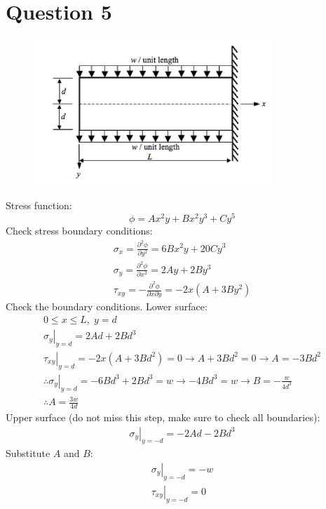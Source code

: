 \section{Question 5}
\begin{figure}[H]
    \centering
    \includegraphics[width = 0.8\textwidth]{./img/diagram1.png}
    \caption{}
\end{figure}
Stress function:
\begin{equation}
    \phi = Ax^2 y + Bx^2 y^3 + Cy^5
\end{equation}
Check stress boundary conditions:
\begin{gather}
    \sigma_x = \frac{\partial^2 \phi}{\partial y^2} = 6Bx^2 y + 20Cy^3\\
    \sigma_y = \frac{\partial^2 \phi}{\partial x^2} = 2Ay + 2By^3\\
    \tau_{xy} = -\frac{\partial^2 \phi}{\partial x\partial y} = -2x\left(A + 3By^2\right)
\end{gather}
Check the boundary conditions. Lower surface:
\begin{gather}
    0 \leq x \leq L, \; y = d\\
    \left. \sigma_y \right|_{y=d} = 2Ad + 2Bd^3 \\
    \left. \tau_{xy} \right|_{y=d} = -2x(A+3Bd^2) = 0 \rightarrow A + 3Bd^2 = 0 \rightarrow A = -3Bd^2\\
    \therefore \left. \sigma_y \right|_{y=d} = -6Bd^3 + 2Bd^3 = w \rightarrow -4Bd^3 = w \rightarrow B = - \frac{w}{4d^3}\\
    \therefore A = \frac{3w}{4d}
\end{gather}
Upper surface (do not miss this step, make sure to check all boundaries):
\begin{gather}
    \left. \sigma_y\right|_{y=-d} = -2Ad -2Bd^3
\end{gather}
Substitute $A$ and $B$:
\begin{gather}
    \left. \sigma_y\right|_{y=-d} = -w\\
    \left. \tau_{xy} \right|_{y=-d} = 0
\end{gather}
